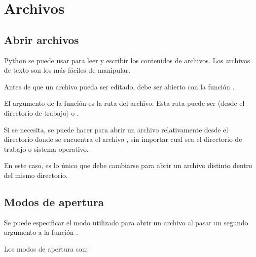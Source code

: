 \chapter{Archivos}

\section{Abrir archivos}

Python se puede usar para leer y escribir los contenidos de archivos.
Los archivos de texto son los más fáciles de manipular.\medskip

Antes de que un archivo pueda ser editado, debe ser abierto con la función .


El argumento de la función  es la ruta del archivo.
Esta ruta puede ser  (desde el directorio de trabajo) o .\medskip

Si se necesita, se puede hacer  para abrir un archivo relativamente desde el directorio donde se encuentra el archivo , sin importar cual sea el directorio de trabajo o sistema operativo.


En este caso,  es lo único que debe cambiarse para abrir un archivo distinto dentro del mismo directorio.

\section{Modos de apertura}

Se puede especificar el modo utilizado para abrir un archivo al pasar un segundo argumento a la función .

Los modos de apertura son:

